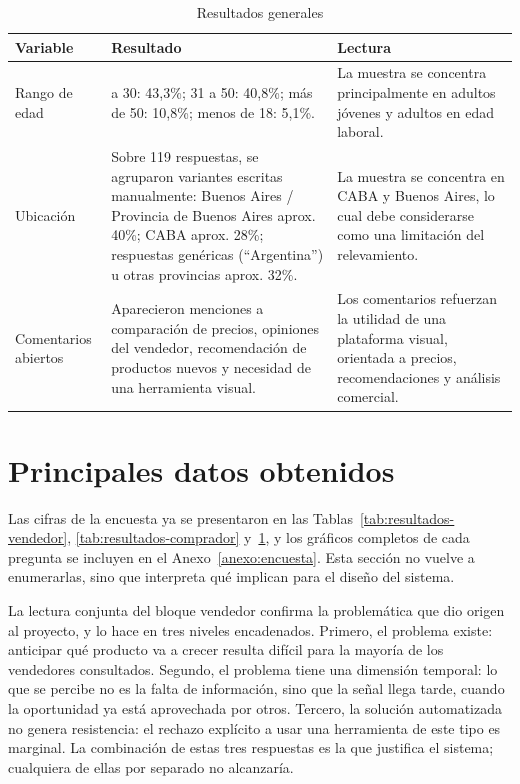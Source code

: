 \begin{table}[ht]
	\centering
	\caption{Resultados generales}
	\label{tab:resultados-generales}
	\begin{tabularx}{\textwidth}{@{}>{\raggedright\arraybackslash}p{2.5cm} >{\raggedright\arraybackslash}p{6cm} X@{}}
		\toprule
		\textbf{Variable} & \textbf{Resultado} & \textbf{Lectura} \\
		\midrule
		Rango de edad & 18 a 30: 43,3\%; 31 a 50: 40,8\%; más de 50: 10,8\%; menos de 18: 5,1\%. & La muestra se concentra principalmente en adultos jóvenes y adultos en edad laboral. \\
		Ubicación & Sobre 119 respuestas, se agruparon variantes escritas manualmente: Buenos Aires / Provincia de Buenos Aires aprox. 40\%; CABA aprox. 28\%; respuestas genéricas (``Argentina'') u otras provincias aprox. 32\%. & La muestra se concentra en CABA y Buenos Aires, lo cual debe considerarse como una limitación del relevamiento. \\
		Comentarios abiertos & Aparecieron menciones a comparación de precios, opiniones del vendedor, recomendación de productos nuevos y necesidad de una herramienta visual. & Los comentarios refuerzan la utilidad de una plataforma visual, orientada a precios, recomendaciones y análisis comercial. \\
		\bottomrule
	\end{tabularx}
\end{table}

\section{Principales datos obtenidos}

Las cifras de la encuesta ya se presentaron en las Tablas~\ref{tab:resultados-vendedor}, \ref{tab:resultados-comprador} y~\ref{tab:resultados-generales}, y los gráficos completos de cada pregunta se incluyen en el Anexo~\ref{anexo:encuesta}. Esta sección no vuelve a enumerarlas, sino que interpreta qué implican para el diseño del sistema.

La lectura conjunta del bloque vendedor confirma la problemática que dio origen al proyecto, y lo hace en tres niveles encadenados. Primero, el problema existe: anticipar qué producto va a crecer resulta difícil para la mayoría de los vendedores consultados. Segundo, el problema tiene una dimensión temporal: lo que se percibe no es la falta de información, sino que la señal llega tarde, cuando la oportunidad ya está aprovechada por otros. Tercero, la solución automatizada no genera resistencia: el rechazo explícito a usar una herramienta de este tipo es marginal. La combinación de estas tres respuestas es la que justifica el sistema; cualquiera de ellas por separado no alcanzaría.

